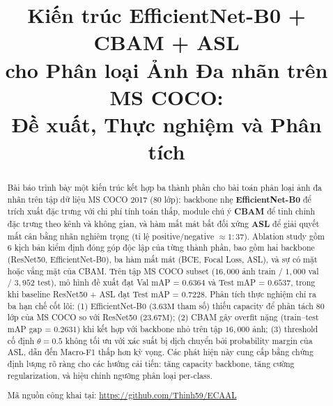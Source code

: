 \documentclass[conference]{IEEEtran}
\begin{document}
\title{%
  Kiến trúc EfficientNet-B0 + CBAM + ASL\\
  cho Phân loại Ảnh Đa nhãn trên MS COCO:\\
  Đề xuất, Thực nghiệm và Phân tích
}

\author{%
  \and
}

\maketitle

\begin{abstract}
Bài báo trình bày một kiến trúc kết hợp ba thành phần cho bài toán
phân loại ảnh đa nhãn trên tập dữ liệu MS COCO 2017 (80 lớp):
backbone nhẹ \textbf{EfficientNet-B0} để trích xuất đặc trưng với
chi phí tính toán thấp, module chú ý \textbf{CBAM} để tinh chỉnh
đặc trưng theo kênh và không gian, và hàm mất mát bất đối xứng
\textbf{ASL} để giải quyết mất cân bằng nhãn nghiêm trọng
(tỉ lệ positive/negative $\approx 1{:}37$).
Ablation study gồm 6 kịch bản kiểm định đóng góp độc lập của
từng thành phần, bao gồm hai backbone (ResNet50, EfficientNet-B0),
ba hàm mất mát (BCE, Focal Loss, ASL), và sự có mặt hoặc vắng mặt
của CBAM.
Trên tập MS COCO subset ($16{,}000$ ảnh train / $1{,}000$ val /
$3{,}952$ test), mô hình đề xuất đạt Val mAP = $0.6364$ và
Test mAP = $0.6537$, trong khi baseline ResNet50 + ASL đạt
Test mAP = $0.7228$.
Phân tích thực nghiệm chỉ ra ba hạn chế cốt lõi:
(1) EfficientNet-B0 ($3.63\text{M}$ tham số) thiếu capacity
để phân tách 80 lớp của MS COCO so với ResNet50 ($23.67\text{M}$);
(2) CBAM gây overfit nặng (train–test mAP gap = $0.2631$) khi kết
hợp với backbone nhỏ trên tập $16{,}000$ ảnh;
(3) threshold cố định $\theta{=}0.5$ không tối ưu với xác suất
bị dịch chuyển bởi probability margin của ASL, dẫn đến
Macro-F1 thấp hơn kỳ vọng.
Các phát hiện này cung cấp bằng chứng định lượng rõ ràng
cho các hướng cải tiến: tăng capacity backbone, tăng cường
regularization, và hiệu chỉnh ngưỡng phân loại per-class.

Mã nguồn công khai tại:
\url{https://github.com/Thinh59/ECAAL}
\end{abstract}
\end{document}
